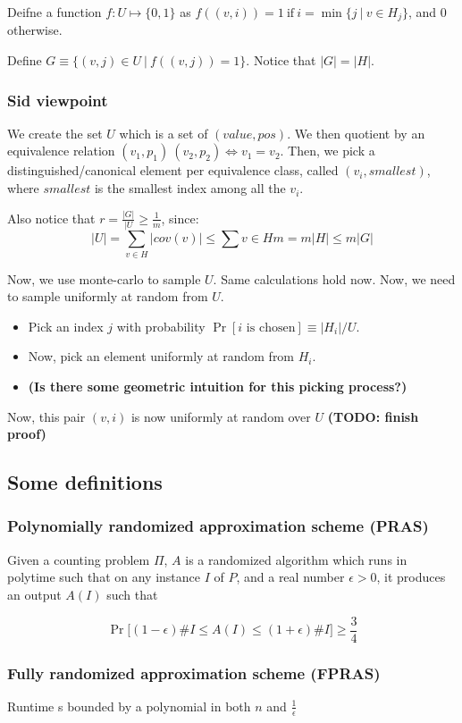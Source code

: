 Deifne a function $f: U \mapsto \{0, 1\}$ as $f((v, i)) = 1~\text{if}~i = \min \{j~|~ v \in H_j \}$,
and $0$ otherwise.

Define $G \equiv \{ (v, j) \in U~\vert~f((v, j)) = 1 \}$. Notice that
$|G| = |H|$.

\subsubsection{Sid viewpoint}
We create the set $U$ which is a set of $(value, pos)$. We then quotient
by an equivalence relation $(v_1, p_1) ~ (v_2, p_2) \iff v_1 = v_2$. Then, we pick
a distinguished/canonical element per equivalence class, called $(v_i, smallest)$, where
$smallest$ is the smallest index among all the $v_i$.

Also notice that $r = \frac{|G|}{|U} \geq \frac{1}{m}$, since:
$$
|U| = \sum_{v \in H} |cov(v)| \leq \sum{v \in H} m = m |H| \leq m |G|
$$

Now, we use monte-carlo to sample $U$. Same calculations hold now. Now, we need to
sample uniformly at random from $U$.

\begin{itemize}
    \item Pick an index $j$ with probability
        $\Pr [\text{$i$ is chosen}] \equiv |H_i| / U$.
    \item Now, pick an element uniformly at random from $H_i$.
    \item \textbf{(Is there some geometric intuition for this picking process?)}
\end{itemize}
Now, this pair $(v, i)$ is now uniformly at random over $U$ \textbf{(TODO: finish proof)}

\subsection{Some definitions}

\subsubsection{Polynomially randomized approximation scheme (PRAS)}
Given a counting problem $\Pi$, $A$ is a randomized algorithm which runs
in polytime such that on any instance $I$ of $P$, and a real number $\epsilon > 0$,
it produces an output $A(I)$ such that 

$$
\Pr \big[ (1 - \epsilon) \#I \leq A(I) \leq (1 + \epsilon) \#I \big ] \geq \frac{3}{4}
$$

\subsubsection{Fully randomized approximation scheme (FPRAS)}
Runtime s bounded by a polynomial in both $n$ and $\frac{1}{\epsilon}$


